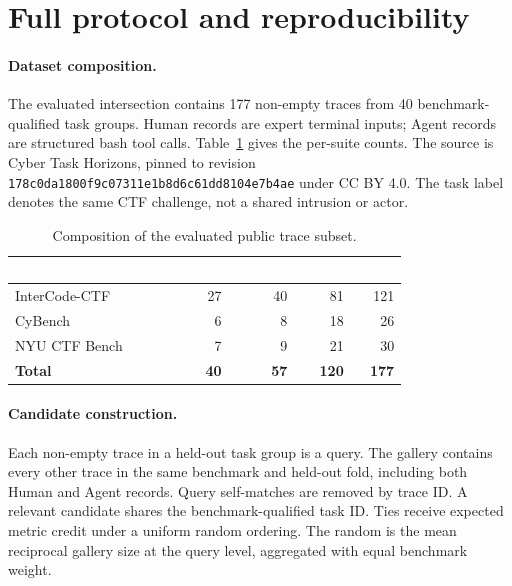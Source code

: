 \section{Full protocol and reproducibility}

\paragraph{Dataset composition.} The evaluated intersection contains 177 non-empty traces from 40 benchmark-qualified task groups. Human records are expert terminal inputs; Agent records are structured bash tool calls. Table~\ref{tab:appendix-data} gives the per-suite counts. The source is Cyber Task Horizons, pinned to revision \texttt{178c0da1800f9c07311e1b8d6c61dd8104e7b4ae} under CC BY 4.0. The task label denotes the same CTF challenge, not a shared intrusion or actor.

\begin{table}[t]
\centering
\caption{Composition of the evaluated public trace subset.}
\label{tab:appendix-data}
\small
{}
\begin{tabularx}{0.84\linewidth}{>{\raggedright\arraybackslash}Xrrrr}
\toprule
\rowcolor{InkBlue}\textcolor{white}{Benchmark} & \textcolor{white}{Task groups} & \textcolor{white}{Human} & \textcolor{white}{Agent} & \textcolor{white}{Total} \\
\midrule
InterCode-CTF & 27 & 40 & 81 & 121 \\
CyBench & 6 & 8 & 18 & 26 \\
NYU CTF Bench & 7 & 9 & 21 & 30 \\
\rowcolor{PaleBlue}\textbf{Total} & \textbf{40} & \textbf{57} & \textbf{120} & \textbf{177} \\
\bottomrule
\end{tabularx}
\end{table}

\paragraph{Candidate construction.} Each non-empty trace in a held-out task group is a query. The gallery contains every other trace in the same benchmark and held-out fold, including both Human and Agent records. Query self-matches are removed by trace ID. A relevant candidate shares the benchmark-qualified task ID. Ties receive expected metric credit under a uniform random ordering. The random \Hit{} is the mean reciprocal gallery size at the query level, aggregated with equal benchmark weight.

